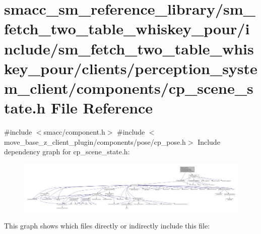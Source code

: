 \hypertarget{sm__fetch__two__table__whiskey__pour_2include_2sm__fetch__two__table__whiskey__pour_2clients_2pe1d884b2ae39657d62d2e1b48dc324a87}{}\section{smacc\+\_\+sm\+\_\+reference\+\_\+library/sm\+\_\+fetch\+\_\+two\+\_\+table\+\_\+whiskey\+\_\+pour/include/sm\+\_\+fetch\+\_\+two\+\_\+table\+\_\+whiskey\+\_\+pour/clients/perception\+\_\+system\+\_\+client/components/cp\+\_\+scene\+\_\+state.h File Reference}
\label{sm__fetch__two__table__whiskey__pour_2include_2sm__fetch__two__table__whiskey__pour_2clients_2pe1d884b2ae39657d62d2e1b48dc324a87}
{\ttfamily \#include $<$smacc/component.\+h$>$}\newline
{\ttfamily \#include $<$move\+\_\+base\+\_\+z\+\_\+client\+\_\+plugin/components/pose/cp\+\_\+pose.\+h$>$}\newline
Include dependency graph for cp\+\_\+scene\+\_\+state.\+h\+:
\nopagebreak
\begin{figure}[H]
\begin{center}
\leavevmode
\includegraphics[width=350pt]{sm__fetch__two__table__whiskey__pour_2include_2sm__fetch__two__table__whiskey__pour_2clients_2pe7ccdfd66b5404fa52002accbf49e498a}
\end{center}
\end{figure}
This graph shows which files directly or indirectly include this file\+:
\nopagebreak
